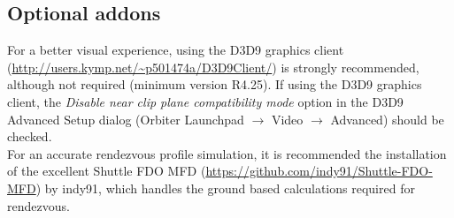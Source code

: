 \documentclass[Space_Shuttle_Vessel_Manual.tex]{subfiles}
\begin{document}
\begin{multicols*}{2}
\subsection{Optional addons}
For a better visual experience, using the D3D9 graphics client (\url{http://users.kymp.net/~p501474a/D3D9Client/}) is strongly recommended, although not required (minimum version R4.25). If using the D3D9 graphics client, the \textit{Disable near clip plane compatibility mode} option in the D3D9 Advanced Setup dialog (Orbiter Launchpad $\rightarrow$ Video $\rightarrow$ Advanced) should be checked.\\
For an accurate rendezvous profile simulation, it is recommended the installation of the excellent Shuttle FDO MFD (\url{https://github.com/indy91/Shuttle-FDO-MFD}) by indy91, which handles the ground based calculations required for rendezvous.\\
\end{multicols*}
\end{document}
